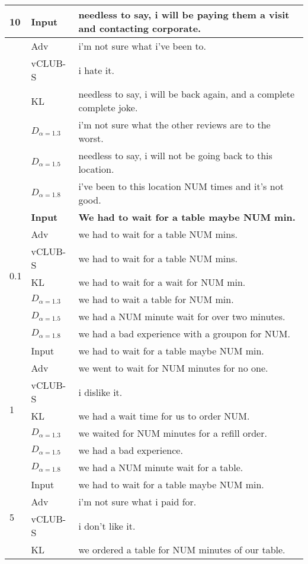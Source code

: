 \begin{longtable}[ht]{ll|l}
\multirow{7}{*}{10} &Input  & needless to say, i will be paying them a visit and contacting corporate.  \\\hline
&Adv  &  	i'm not sure what i've been to. \\
&  vCLUB-S    &  i hate it. \\
&KL  & 	needless to say, i will be back again, and a complete complete joke.  \\
&$D_{\alpha=1.3}$  &	i'm not sure what the other reviews are to the worst.  \\
&$D_{\alpha=1.5}$  & 	needless to say, i will not be going back to this location.\\
&$D_{\alpha=1.8}$  & i've been to this location NUM times and it's not good.\\ \hline\hline
\multirow{7}{*}{0.1} &\textbf{Input}  &  \textbf{We had to wait for a table maybe NUM min.} \\\hline
&Adv  &  we had to wait for a table NUM mins.	 \\
&vCLUB-S  & we had to wait for a table NUM mins.  \\
&KL  & 	 we had to wait for a wait for NUM min. \\
&$D_{\alpha=1.3}$  & we had to wait a table for NUM min.\\
&$D_{\alpha=1.5}$  &	we had a NUM minute wait for over two minutes. \\
&$D_{\alpha=1.8}$  & we had a bad experience with a groupon for NUM.\\ \hline
\multirow{7}{*}{1} &Input  &  we had to wait for a table maybe NUM min. \\
&Adv  &  we went to wait for NUM minutes for no one.	 \\
&vCLUB-S  & i dislike it.  \\
&KL  & 		we had a wait time for us to order NUM. 
 \\
&$D_{\alpha=1.3}$  & we waited for NUM minutes for a refill order. \\
&$D_{\alpha=1.5}$  & 	we had a bad experience. \\
&$D_{\alpha=1.8}$  & 	we had a NUM minute wait for a table. \\ \hline
\multirow{7}{*}{5} &Input  & we had to wait for a table maybe NUM min.  \\\hline
&Adv  &  	i'm not sure what i paid for.	 \\
&vCLUB-S  & i don't like it.  \\
&KL  & 		we ordered a table for NUM minutes of our table.  \\

\end{longtable}
